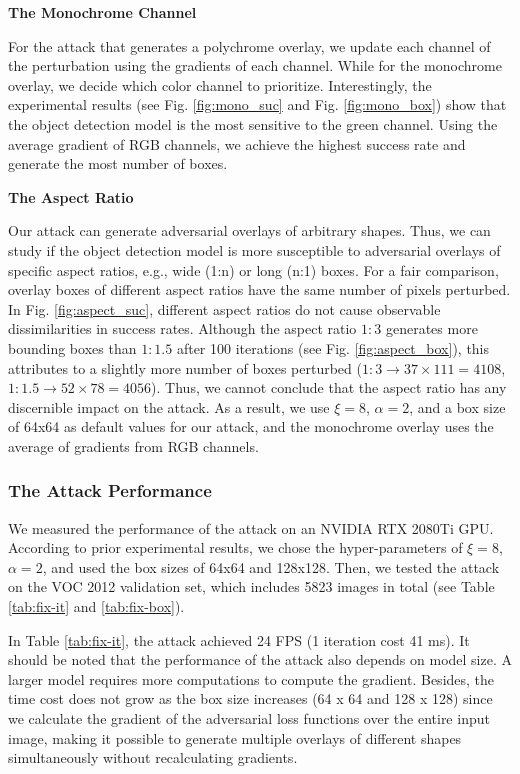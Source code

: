 \textbf{The Monochrome Channel}

For the attack that generates a polychrome overlay, we update each channel of the perturbation using the gradients of each channel. While for the monochrome overlay, we decide which color channel to prioritize. Interestingly, the experimental results (see Fig. \ref{fig:mono_suc} and Fig. \ref{fig:mono_box}) show that the object detection model is the most sensitive to the green channel. Using the average gradient of RGB channels, we achieve the highest success rate and generate the most number of boxes.

\textbf{The Aspect Ratio}

Our attack can generate adversarial overlays of arbitrary shapes. Thus, we can study if the object detection model is more susceptible to adversarial overlays of specific aspect ratios, e.g., wide (1:n) or long (n:1) boxes. For a fair comparison, overlay boxes of different aspect ratios have the same number of pixels perturbed. In Fig. \ref{fig:aspect_suc}, different aspect ratios do not cause observable dissimilarities in success rates. Although the aspect ratio $1:3$ generates more bounding boxes than $1:1.5$ after 100 iterations (see Fig. \ref{fig:aspect_box}), this attributes to a slightly more number of boxes perturbed ($1:3 \rightarrow 37 \times 111 = 4108$, $1:1.5 \rightarrow 52 \times 78 = 4056$). Thus, we cannot conclude that the aspect ratio has any discernible impact on the attack. As a result, we use $\xi=8$, $\alpha=2$, and a box size of 64x64 as default values for our attack, and the monochrome overlay uses the average of gradients from RGB channels.

\subsubsection{The Attack Performance}

We measured the performance of the attack on an NVIDIA RTX 2080Ti GPU. According to prior experimental results, we chose the hyper-parameters of $\xi=8$, $\alpha=2$, and used the box sizes of 64x64 and 128x128. Then, we tested the attack on the VOC 2012 validation set, which includes 5823 images in total (see Table \ref{tab:fix-it} and \ref{tab:fix-box}).



In Table \ref{tab:fix-it}, the attack achieved 24 FPS (1 iteration cost 41 ms). It should be noted that the performance of the attack also depends on model size. A larger model requires more computations to compute the gradient. Besides, the time cost does not grow as the box size increases (64 x 64 and 128 x 128) since we calculate the gradient of the adversarial loss functions over the entire input image, making it possible to generate multiple overlays of different shapes simultaneously without recalculating gradients.

